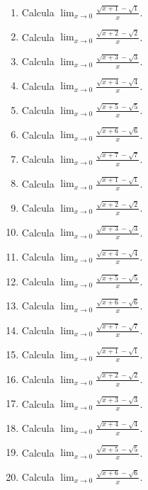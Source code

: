\documentclass[11pt,a4paper]{article}
\begin{document}
\begin{enumerate}[label=\textbf{E\arabic*.},start=501]

\item Calcula $\displaystyle\lim_{x\to0}\frac{\sqrt{x+1}-\sqrt{1}}{x}$.

\item Calcula $\displaystyle\lim_{x\to0}\frac{\sqrt{x+2}-\sqrt{2}}{x}$.

\item Calcula $\displaystyle\lim_{x\to0}\frac{\sqrt{x+3}-\sqrt{3}}{x}$.

\item Calcula $\displaystyle\lim_{x\to0}\frac{\sqrt{x+4}-\sqrt{4}}{x}$.

\item Calcula $\displaystyle\lim_{x\to0}\frac{\sqrt{x+5}-\sqrt{5}}{x}$.

\item Calcula $\displaystyle\lim_{x\to0}\frac{\sqrt{x+6}-\sqrt{6}}{x}$.

\item Calcula $\displaystyle\lim_{x\to0}\frac{\sqrt{x+7}-\sqrt{7}}{x}$.

\item Calcula $\displaystyle\lim_{x\to0}\frac{\sqrt{x+1}-\sqrt{1}}{x}$.

\item Calcula $\displaystyle\lim_{x\to0}\frac{\sqrt{x+2}-\sqrt{2}}{x}$.

\item Calcula $\displaystyle\lim_{x\to0}\frac{\sqrt{x+3}-\sqrt{3}}{x}$.

\item Calcula $\displaystyle\lim_{x\to0}\frac{\sqrt{x+4}-\sqrt{4}}{x}$.

\item Calcula $\displaystyle\lim_{x\to0}\frac{\sqrt{x+5}-\sqrt{5}}{x}$.

\item Calcula $\displaystyle\lim_{x\to0}\frac{\sqrt{x+6}-\sqrt{6}}{x}$.

\item Calcula $\displaystyle\lim_{x\to0}\frac{\sqrt{x+7}-\sqrt{7}}{x}$.

\item Calcula $\displaystyle\lim_{x\to0}\frac{\sqrt{x+1}-\sqrt{1}}{x}$.

\item Calcula $\displaystyle\lim_{x\to0}\frac{\sqrt{x+2}-\sqrt{2}}{x}$.

\item Calcula $\displaystyle\lim_{x\to0}\frac{\sqrt{x+3}-\sqrt{3}}{x}$.

\item Calcula $\displaystyle\lim_{x\to0}\frac{\sqrt{x+4}-\sqrt{4}}{x}$.

\item Calcula $\displaystyle\lim_{x\to0}\frac{\sqrt{x+5}-\sqrt{5}}{x}$.

\item Calcula $\displaystyle\lim_{x\to0}\frac{\sqrt{x+6}-\sqrt{6}}{x}$.

\end{enumerate}
\end{document}
